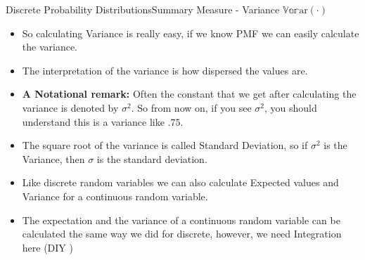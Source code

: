 \documentclass[8pt, usepdftitle=false]{beamer}
\begin{document}
\begin{frame}[allowframebreaks]{Discrete Probability Distributions}{Summary Measure - Variance $\mathbb{Var}\mathrm{ar}(\cdot)$}
\begin{itemize}
\item So calculating Variance is really easy, if we know PMF we can easily calculate the variance. 

\item The interpretation of the variance is how dispersed the values are.

\item \textbf{\color{red}A Notational remark:} Often the constant that we get after calculating the variance is denoted by $\sigma^2$. So from now on, if you see $\sigma^2$, you should understand this is a variance like $.75$.

\item The square root of the variance is called \alert{Standard Deviation}, so if $\sigma^2$ is the Variance, then $\sigma$ is the standard deviation.



\item Like discrete random variables we can also calculate Expected values and Variance for a continuous random variable.

\item The expectation and the variance of a continuous random variable can be calculated the same way we did for discrete, however, we need \alert{Integration} here (DIY \faEdit \faEdit \faEdit)



\end{itemize} 


\end{frame}







\end{document}
